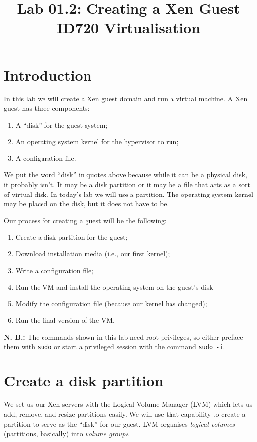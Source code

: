 \documentclass{article}
\begin{document}
\title{Lab 01.2: Creating a Xen Guest\\ ID720 Virtualisation}
\date{}
\maketitle

\section*{Introduction}
In this lab we will create a Xen guest domain and run a virtual machine.  A Xen guest has three components:

\begin{enumerate}
  \item A ``disk'' for the guest system;
  \item An operating system kernel for the hypervisor to run;
  \item A configuration file.
\end{enumerate}

We put the word ``disk'' in quotes above because while it can be a physical disk, it probably isn't. It may be a disk partition or it may be a file that acts as a sort of virtual disk. In today's lab we will use a partition. The operating system kernel may be placed on the disk, but it does not have to be.

Our process for creating a guest will be the following:

\begin{enumerate}
  \item Create a disk partition for the guest;
  \item Download installation media (i.e., our first kernel);
  \item Write a configuration file;
  \item Run the VM and install the operating system on the guest's disk;
  \item Modify the configuration file (because our kernel has changed);
  \item Run the final version of the VM.
 \end{enumerate}
 
 \textbf{N. B.:} The commands shown in this lab need root privileges, so either preface them with \texttt{sudo} or start a privileged session with the command 
 \texttt{sudo -i}.
 
 \section{Create a disk partition}
 We set us our Xen servers with the Logical Volume Manager (LVM) which lets us add, remove, and resize partitions easily. We will use that capability to create a partition to serve as the ``disk'' for our guest. LVM organises \emph{logical volumes} (partitions, basically) into \emph{volume groups}.
 
\end{document}
